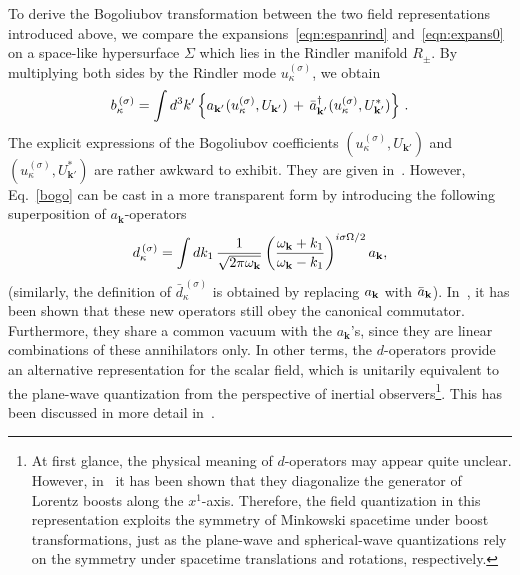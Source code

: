 \documentclass[floats,prd,aps,amssymb,nofootinbib,showkeys]{revtex4}
\begin{document}
To derive the Bogoliubov transformation 
between the two field representations introduced above, we
compare the expansions~\eqref{eqn:espanrind} 
and~\eqref{eqn:expans0}
on a space-like hypersurface $\Sigma$ 
which lies in the Rindler manifold $R_\pm$.
By multiplying both sides by the Rindler mode $u^{(\sigma)}_{\kappa}$,
we obtain~\cite{Takagi}
\begin{equation}
b_{\kappa}^{\,(\sigma)}=\int d^3k'\left\{a_{\textbf{k}'}\hspace{0.1mm}(u^{(\sigma)}_{\kappa},U_{\textbf{k}'})\,+\,\bar a^\dagger_{\textbf{k}'}\hspace{0.1mm}(u^{(\sigma)}_{\kappa},U^*_{\textbf{k}'})
\right\}\,. 
\label{bogo}
\end{equation}
The explicit expressions of the Bogoliubov coefficients $(u^{(\sigma)}_{\kappa},U_{\textbf{k}'})$ and $(u^{(\sigma)}_{\kappa},U^*_{\textbf{k}'})$
are rather awkward to exhibit. They are given in~\cite{Takagi}.
However, Eq.~\eqref{bogo}
can be cast in a more transparent form 
by introducing the following superposition of $a_{\textbf{k}}$-operators
\begin{equation}
\label{eqn:operat-d}
d_{\kappa}^{\,(\sigma)}=\int dk_1\, \frac{1}{\sqrt{2\pi\omega_{\bf {k}}}}\, {\bigg(\frac{\omega_{{\bf {k}}}+k_1}{\omega_{{\bf {k}}}-k_1}\bigg)}^{i\sigma\Omega/2}\, a_{{\bf {k}}},
\end{equation}
(similarly, the definition of $\bar d_{\kappa}^{\,(\sigma)}$ is obtained
by replacing $a_{{\bf {k}}}$ with $\bar a_{{\bf {k}}}$). In~\cite{Takagi},
it has been shown that these new operators still obey the canonical commutator. Furthermore, they share a common vacuum with the 
$a_{\textbf{k}}$'s, since they are linear combinations of these annihilators only. In other terms, the $d$-operators
provide an alternative representation
for the scalar field, which is unitarily equivalent
to the plane-wave quantization from the perspective
of inertial observers\footnote{At first glance, the physical meaning
of $d$-operators may appear quite unclear.
However, in~\cite{Takagi} it has been shown that 
they diagonalize the generator of Lorentz boosts along the $x^1$-axis. Therefore, the field quantization in this representation 
exploits the symmetry of Minkowski spacetime under boost transformations, just as the plane-wave and spherical-wave quantizations 
rely on the symmetry under spacetime translations and rotations, respectively.}. This has been discussed in more detail in~\cite{Luciano}. 
\end{document}
